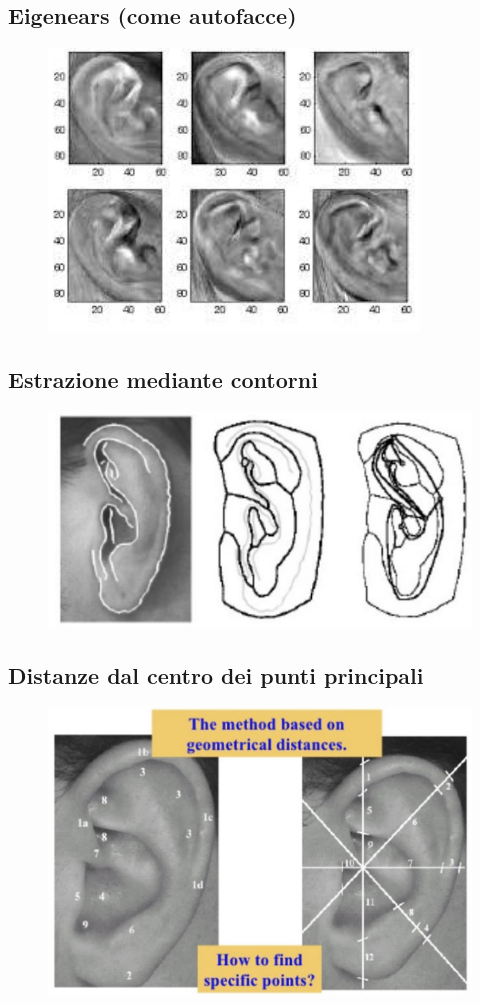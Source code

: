 \documentclass{report}
\begin{document}
\subsection{Eigenears (come autofacce)}
\begin{figure}[H]
    \centering
    \includegraphics[width=0.8\linewidth]{images/eigenears.png}
\end{figure}

\subsection{Estrazione mediante contorni}
\begin{figure}[H]
    \centering
    \includegraphics[width=0.8\linewidth]{images/contorni.png}
\end{figure}

\newpage
\subsection{Distanze dal centro dei punti principali}
\begin{figure}[ht]
    \centering
    \includegraphics[width=0.9\linewidth]{images/punti.png}
\end{figure}
\end{document}
